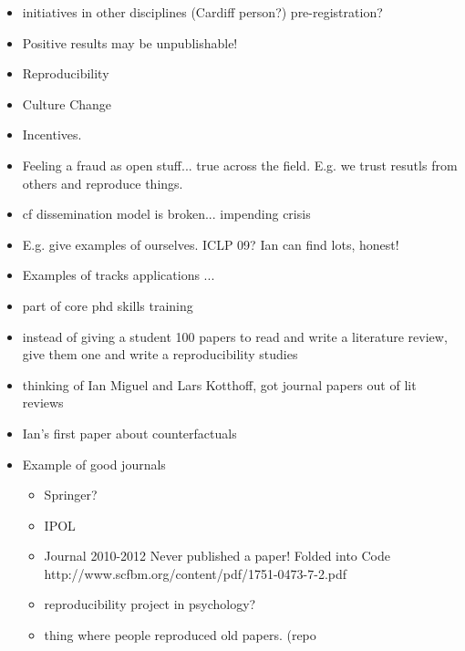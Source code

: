 \documentclass[a4paper,11pt]{article}
\begin{document}
\begin{itemize}


\item initiatives in other disciplines (Cardiff person?) pre-registration?
\item Positive results may be unpublishable!   

\item Reproducibility

\item Culture Change 
\item Incentives.  

\item Feeling a fraud as open stuff... true across the field.  E.g. we trust resutls from others and reproduce things.

\item cf dissemination model is broken... impending crisis

\item E.g. give examples of ourselves.   ICLP 09?  Ian can find lots, honest!

\item Examples of tracks applications ... 

\item part of core phd skills training
\item instead of giving a student 100 papers to read and write a literature review, give them one and write a reproducibility studies
\item thinking of Ian Miguel and Lars Kotthoff, got journal papers out of lit reviews
\item Ian's first paper about counterfactuals





\item Example of good journals
\begin{itemize}
\item Springer?
\item IPOL
\item
Journal 2010-2012
Never published a paper!
Folded into Code 
http://www.scfbm.org/content/pdf/1751-0473-7-2.pdf

\item reproducibility project in psychology?

\item thing where people reproduced old papers.  (repo 

\end{itemize}



\end{itemize}
\end{document}

